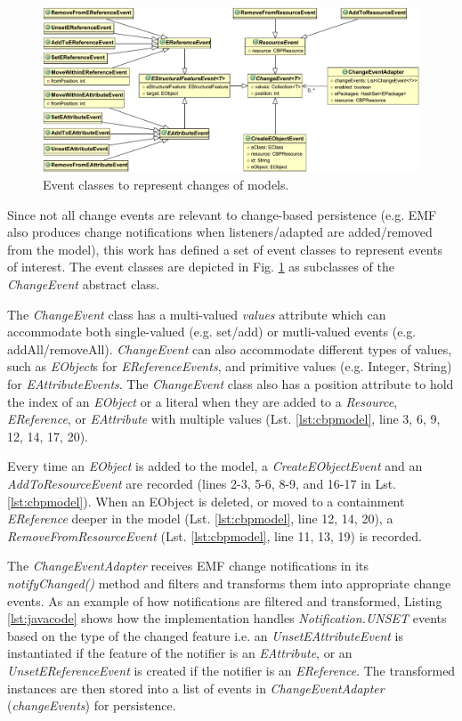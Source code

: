 \documentclass[12pt, a4paper]{report} \usepackage[titletoc]{appendix}
\begin{document}
\begin{figure}[th]
	\centering
	\includegraphics[width=\linewidth]{events}
	\caption{Event classes to represent changes of models.}
	\label{fig:events}
\end{figure}

Since not all change events are relevant to change-based persistence (e.g. EMF also produces change notifications when listeners/adapted are added/removed from the model), this work has defined a set of event classes to represent events of interest. The event classes are depicted in Fig. \ref{fig:events} as subclasses of the \emph{ChangeEvent} abstract class. 

The \emph{ChangeEvent} class has a multi-valued \emph{values} attribute which can accommodate both single-valued (e.g. set/add) or mutli-valued events (e.g. addAll/removeAll). \emph{ChangeEvent} can also accommodate different types of values, such as \emph{EObject}s for \emph{EReferenceEvents}, and primitive values (e.g. Integer, String) for \emph{EAttributeEvents}. The \emph{ChangeEvent} class also has a position attribute to hold the index of an \emph{EObject} or a literal when they are added to a \emph{Resource}, \emph{EReference}, or \emph{EAttribute} with multiple values (Lst. \ref{lst:cbpmodel}, line 3, 6, 9, 12, 14, 17, 20). 

Every time an \emph{EObject} is added to the model, a \emph{CreateEObjectEvent} and an \emph{AddToResourceEvent} are recorded (lines 2-3, 5-6, 8-9, and 16-17 in Lst. \ref{lst:cbpmodel}). When an EObject is deleted, or moved to a containment \emph{EReference} deeper in the model (Lst. \ref{lst:cbpmodel}, line 12, 14, 20), a \emph{RemoveFromResourceEvent} (Lst. \ref{lst:cbpmodel}, line 11, 13, 19) is recorded.

The \emph{ChangeEventAdapter} receives EMF change notifications in its \emph{notifyChanged()} method and filters and transforms them into appropriate change events. As an example of how notifications are filtered and transformed, Listing \ref{lst:javacode} shows how the implementation handles \emph{Notification.UNSET} events based on the type of the changed feature i.e. an \emph{UnsetEAttributeEvent} is instantiated if the feature of the notifier is an \emph{EAttribute}, or an \emph{UnsetEReferenceEvent} is created if the notifier is an \emph{EReference}. The transformed instances are then stored into a list of events in \emph{ChangeEventAdapter} (\emph{changeEvents}) for persistence. 
\end{document}
